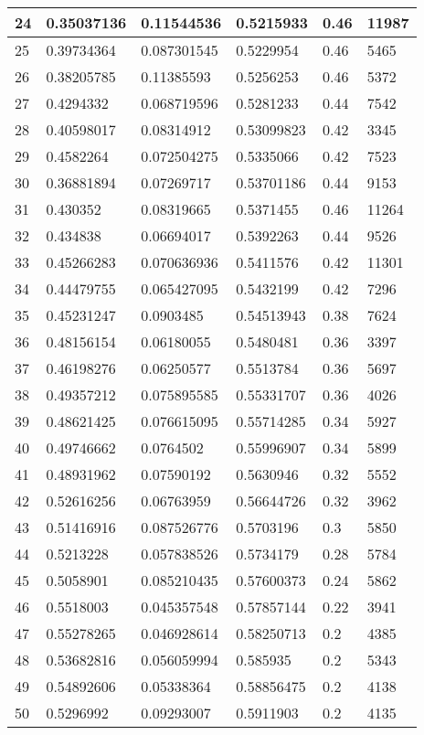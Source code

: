 \begin{longtable}{|l|l|l|l|l|l|}
24 & 0.35037136 & 0.11544536 & 0.5215933 & 0.46 & 11987 \\ \hline 
25 & 0.39734364 & 0.087301545 & 0.5229954 & 0.46 & 5465 \\ \hline 
26 & 0.38205785 & 0.11385593 & 0.5256253 & 0.46 & 5372 \\ \hline 
27 & 0.4294332 & 0.068719596 & 0.5281233 & 0.44 & 7542 \\ \hline 
28 & 0.40598017 & 0.08314912 & 0.53099823 & 0.42 & 3345 \\ \hline 
29 & 0.4582264 & 0.072504275 & 0.5335066 & 0.42 & 7523 \\ \hline 
30 & 0.36881894 & 0.07269717 & 0.53701186 & 0.44 & 9153 \\ \hline 
31 & 0.430352 & 0.08319665 & 0.5371455 & 0.46 & 11264 \\ \hline 
32 & 0.434838 & 0.06694017 & 0.5392263 & 0.44 & 9526 \\ \hline 
33 & 0.45266283 & 0.070636936 & 0.5411576 & 0.42 & 11301 \\ \hline 
34 & 0.44479755 & 0.065427095 & 0.5432199 & 0.42 & 7296 \\ \hline 
35 & 0.45231247 & 0.0903485 & 0.54513943 & 0.38 & 7624 \\ \hline 
36 & 0.48156154 & 0.06180055 & 0.5480481 & 0.36 & 3397 \\ \hline 
37 & 0.46198276 & 0.06250577 & 0.5513784 & 0.36 & 5697 \\ \hline 
38 & 0.49357212 & 0.075895585 & 0.55331707 & 0.36 & 4026 \\ \hline 
39 & 0.48621425 & 0.076615095 & 0.55714285 & 0.34 & 5927 \\ \hline 
40 & 0.49746662 & 0.0764502 & 0.55996907 & 0.34 & 5899 \\ \hline 
41 & 0.48931962 & 0.07590192 & 0.5630946 & 0.32 & 5552 \\ \hline 
42 & 0.52616256 & 0.06763959 & 0.56644726 & 0.32 & 3962 \\ \hline 
43 & 0.51416916 & 0.087526776 & 0.5703196 & 0.3 & 5850 \\ \hline 
44 & 0.5213228 & 0.057838526 & 0.5734179 & 0.28 & 5784 \\ \hline 
45 & 0.5058901 & 0.085210435 & 0.57600373 & 0.24 & 5862 \\ \hline 
46 & 0.5518003 & 0.045357548 & 0.57857144 & 0.22 & 3941 \\ \hline 
47 & 0.55278265 & 0.046928614 & 0.58250713 & 0.2 & 4385 \\ \hline 
48 & 0.53682816 & 0.056059994 & 0.585935 & 0.2 & 5343 \\ \hline 
49 & 0.54892606 & 0.05338364 & 0.58856475 & 0.2 & 4138 \\ \hline 
50 & 0.5296992 & 0.09293007 & 0.5911903 & 0.2 & 4135 \\ \hline 
\end{longtable}